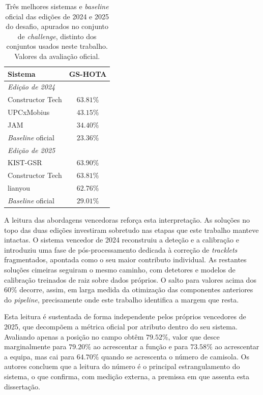 \begin{table}[htbp]
    \centering
    \caption{Três melhores sistemas e \emph{baseline} oficial das edições de 2024 e 2025 do desafio,
    apurados no conjunto de \emph{challenge}, distinto dos conjuntos usados neste trabalho.
    Valores da avaliação oficial.}
    \label{tab:leaderboard}
    \begin{tabular}{lc}
        \hline
        \textbf{Sistema} & \textbf{GS-HOTA} \\
        \hline
        \multicolumn{2}{l}{\emph{Edição de 2024}} \\
        Constructor Tech           & $63.81\%$ \\
        UPCxMobius                 & $43.15\%$ \\
        JAM                        & $34.40\%$ \\
        \emph{Baseline} oficial    & $23.36\%$ \\
        \hline
        \multicolumn{2}{l}{\emph{Edição de 2025}} \\
        KIST-GSR                   & $63.90\%$ \\
        Constructor Tech           & $63.81\%$ \\
        lianyou                    & $62.76\%$ \\
        \emph{Baseline} oficial    & $29.01\%$ \\
        \hline
    \end{tabular}
\end{table}

A leitura das abordagens vencedoras reforça esta interpretação. As soluções no topo das duas
edições investiram sobretudo nas etapas que este trabalho manteve intactas. O sistema
vencedor de 2024 reconstruiu a deteção e a calibração e introduziu uma fase de
pós-processamento dedicada à correção de \emph{tracklets} fragmentados, apontada como o seu
maior contributo individual. As restantes soluções cimeiras seguiram o mesmo caminho, com
detetores e modelos de calibração treinados de raiz sobre dados próprios. O salto para
valores acima dos $60\%$ decorre, assim, em larga medida da otimização das componentes
anteriores do \emph{pipeline}, precisamente onde este trabalho identifica a margem que resta.

Esta leitura é sustentada de forma independente pelos próprios vencedores de 2025, que
decompõem a métrica oficial por atributo dentro do seu sistema. Avaliando apenas a posição no
campo obtêm $79.52\%$, valor que desce marginalmente para $79.20\%$ ao acrescentar a função e
para $73.58\%$ ao acrescentar a equipa, mas cai para $64.70\%$ quando se acrescenta o número
de camisola. Os autores concluem que a leitura do número é o principal estrangulamento do
sistema, o que confirma, com medição externa, a premissa em que assenta esta dissertação.

